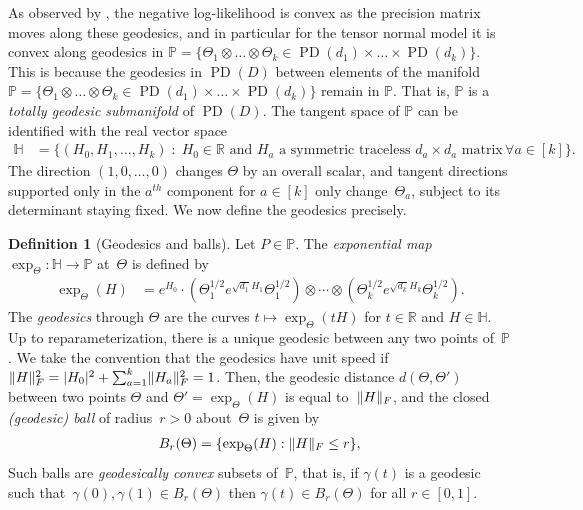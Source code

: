 \documentclass[aos]{imsart}
\theoremstyle{definition}
\newtheorem*{definition}{Definition}
\numberwithin{equation}{section}
\DeclareMathOperator{\PD}{PD}
\DeclarePairedDelimiter{\abs}{\lvert}{\rvert}
\DeclarePairedDelimiter{\norm}{\lVert}{\rVert}
\newcommand{\R}{{\mathbb{R}}}
\renewcommand{\P}{{\mathbb{P}}}
\renewcommand{\H}{{\mathbb{H}}}
\newcommand{\ot}{\otimes}
\begin{document}
As observed by \cite{wiesel2012geodesic}, the negative log-likelihood is convex as the precision matrix moves along these geodesics, and in particular for the tensor normal model it is convex along geodesics in $\P = \{ \Theta_1 \ot \dots \ot \Theta_k \in \PD(d_1) \times \dots \times \PD(d_k) \}$. This is because the geodesics in $\PD(D)$ between elements of the manifold $\P = \{ \Theta_1 \ot \dots \ot \Theta_k \in \PD(d_1) \times \dots \times \PD(d_k) \}$ remain in $\P$. That is, $\P$ is a \emph{totally geodesic submanifold} of $\PD(D)$.  The tangent space of $\P$ can be identified with the real vector space
\begin{align*}
  \H &= \{ (H_0, H_1,\dots,H_k) \;:\; H_0 \in \R \text{ and }H_a \text{ a symmetric traceless $d_a \times d_a$ matrix} \, \forall a \in [k]  \}.
\end{align*}
The direction $(1, 0, \dots, 0)$ changes $\Theta$ by an overall scalar, and tangent directions supported only in the $a^{th}$ component for $a \in [k]$ only change~$\Theta_a$, subject to its determinant staying fixed. We now define the geodesics precisely.

\begin{definition}[Geodesics and balls]
Let $P\in\P$.
The \emph{exponential map} $\exp_\Theta \colon \H \to \P$ at~$\Theta$ is defined by
\begin{align*}
  \exp_\Theta(H) &= e^{H_0} \cdot ( \Theta_1^{1/2} e^{\sqrt{d_1} H_1} \Theta_1^{1/2}) \ot \cdots \ot (\Theta_k^{1/2} e^{\sqrt{d_k} H_k} \Theta_k^{1/2}).
\end{align*}
The \emph{geodesics} through $\Theta$ are the curves $t \mapsto \exp_\Theta(t H)$ for $t\in\R$ and $H\in\H$.
Up to reparameterization, there is a unique geodesic between any two points of~$\P$.
We take the convention that the geodesics have unit speed if $\norm{H}_F^2 = \abs{H_0}^2 + \sum_{a=1}^k \norm{H_a}_F^2 = 1$.
Then, the geodesic distance $d(\Theta,\Theta')$ between two points $\Theta$ and $\Theta'=\exp_\Theta(H)$ is equal to~$\norm H_F$, and the closed \emph{(geodesic) ball} of radius~$r>0$ about~$\Theta$ is given by
\begin{align*}
  B_r(\Theta) = \{ \exp_\Theta(H) : \norm H_F \leq r \},
\end{align*}
Such balls are \emph{geodesically convex} subsets of~$\P$, that is, if $\gamma(t)$ is a geodesic such that~$\gamma(0),\gamma(1) \in B_r(\Theta)$ then $\gamma(t) \in B_r(\Theta)$ for all $r\in[0,1]$.
\end{definition}
\end{document}
